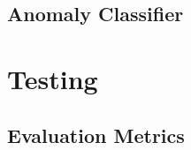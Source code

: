 \textcolor{dimgray}{\lipsum}


\subsection{Anomaly Classifier}
\label{subsec:classifier-implementation}

\textcolor{dimgray}{\lipsum}


\section{Testing}
\label{sec:testing}

\textcolor{dimgray}{\lipsum[1-15]}


\subsection{Evaluation Metrics}
\label{subsec:evaluation-metrics}

\textcolor{dimgray}{\lipsum}
